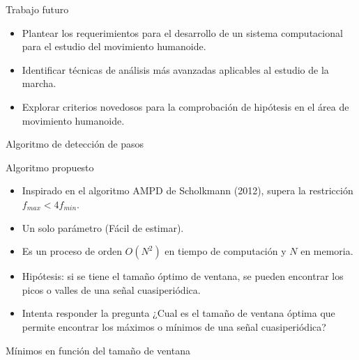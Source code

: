 \documentclass[aspectratio=169,spanish]{beamer} %
\newcommand{\fullbackground}[1]{\usebackgroundtemplate{\texttt{[image: \#1]}}}
\begin{document}
\begin{frame}{Trabajo futuro}
    \begin{itemize}
        \item Plantear los requerimientos para el desarrollo de un sistema computacional para el estudio del movimiento humanoide. 
        \item Identificar técnicas de análisis más avanzadas aplicables al estudio de la marcha. 
        \item Explorar criterios novedosos para la comprobación de hipótesis en el área de movimiento humanoide. 
    \end{itemize}
\end{frame}

\fullbackground{images/ending.png}

\begin{frame}
\end{frame}

\fullbackground{images/slide.png}

\begin{frame}{Algoritmo de detección de pasos}
    
\end{frame}

\begin{frame}{Algoritmo propuesto}
    \begin{itemize}
        \item Inspirado en el algoritmo AMPD de Scholkmann (2012), supera la restricción $f_{max} < 4 f_{min}$.
        \item Un solo parámetro (Fácil de estimar).
        \item Es un proceso de orden $O(N^2)$ en tiempo de computación y $N$ en memoria. 
        \item Hipótesis: si se tiene el tamaño óptimo de ventana, se pueden encontrar los picos o valles de una señal cuasiperiódica.
        \item Intenta responder la pregunta ¿Cual es el tamaño de ventana óptima que permite encontrar los máximos o mínimos de una señal cuasiperiódica?
    \end{itemize}
\end{frame}

\begin{frame}{Mínimos en función del tamaño de ventana}
    
\end{frame}
\end{document}
